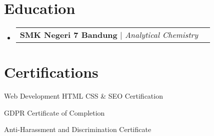 \documentclass[a4paper, 11pt]{article}
\makeatletter
\newcommand{\resumeProjectHeading}[2]{
    \item
    \begin{tabular*}{0.987\textwidth}{l@{\extracolsep{\fill}}r}
      \small#1\\
    \end{tabular*}\vspace{-7pt}
}
\newcommand{\resumeSubHeadingListStart}{\begin{itemize}[leftmargin=0.1in, label={}]}
\newcommand{\resumeSubHeadingListEnd}{\end{itemize}\vspace{5pt}}
\makeatother
\begin{document}
\section{Education}
    \resumeSubHeadingListStart
        \resumeProjectHeading
            {\textbf{SMK Negeri 7 Bandung} $|$ \emph{Analytical Chemistry}}{2009 -- 2011}
    \resumeSubHeadingListEnd

\section{Certifications}
    \resumeSubHeadingListStart
        \small{
            \item Web Development HTML CSS \& SEO Certification
            \item GDPR Certificate of Completion
            \item Anti-Harassment and Discrimination Certificate
        }
    \resumeSubHeadingListEnd
\end{document}
